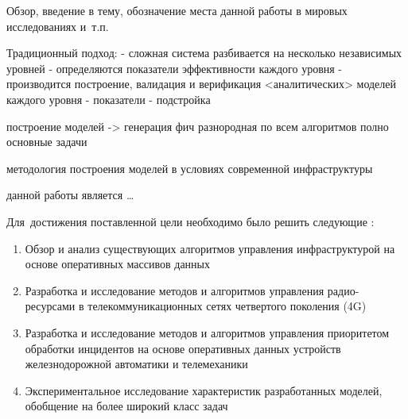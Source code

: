 
{\actuality} Обзор, введение в тему, обозначение места данной работы в
мировых исследованиях и~т.\:п.

Традиционный подход: 
- сложная система разбивается на несколько независимых уровней
- определяются показатели эффективности каждого уровня
- производится построение, валидация и верификация <аналитических> моделей каждого уровня
- показатели 
- подстройка

построение моделей -> генерация фич
разнородная по всем
алгоритмов полно
основные задачи 

методология построения моделей в условиях современной инфраструктуры



{\aim} данной работы является \ldots

Для~достижения поставленной цели необходимо было решить следующие {\tasks}:
\begin{enumerate}
  \item Обзор и анализ существующих алгоритмов управления инфраструктурой на основе оперативных массивов данных
  \item Разработка и исследование методов и алгоритмов управления радио-ресурсами в телекоммуникационных сетях четвертого поколения (4G)
  \item Разработка и исследование методов и алгоритмов управления приоритетом обработки инцидентов на основе оперативных данных устройств железнодорожной автоматики и телемеханики
  \item Экспериментальное исследование характеристик разработанных моделей, обобщение на более широкий класс задач

\end{enumerate}

